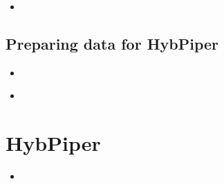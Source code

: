 \documentclass[compress, ucs, xelatex, 11pt, xcolor=x11names, aspectratio=1609,
	hyperref={
		bookmarks=true,
		unicode=true,
		colorlinks=true,
		pdftitle={HybSeq course},
		plainpages=false,
		pdfauthor={Vojtech Zeisek},
		pdfsubject={Practical processing of HybSeq target enrichment sequencing data on computing grids like MetaCentrum},
		pdfcreator={XeLaTeX},
		pdfkeywords={BASH, command line, GNU, HybSeq, Linux, MetaCentrum, sequencing shell, target enrichment},
		linkcolor=Cyan2, %
		anchorcolor=Firebrick2, %
		citecolor=Firebrick2, %
		filecolor=Firebrick2, %
		menucolor=Firebrick2, %
		urlcolor=Chartreuse2, %
		pdftex},
	url={hyphens, lowtilde} %
	]{beamer}
\begin{document}
\begin{frame}[fragile]{}
	\begin{itemize}
		\item 
	\end{itemize}
	\begin{spluscode}
    
	\end{spluscode}
	\begin{bashcode}
    
	\end{bashcode}
\end{frame}

\subsection{Preparing data for HybPiper}

\begin{frame}[fragile]{}
	\begin{itemize}
		\item 
	\end{itemize}
	\begin{spluscode}
    
	\end{spluscode}
	\begin{bashcode}
    
	\end{bashcode}
\end{frame}

\begin{frame}[fragile]{}
	\begin{itemize}
		\item 
	\end{itemize}
	\begin{spluscode}
    
	\end{spluscode}
	\begin{bashcode}
    
	\end{bashcode}
\end{frame}

\section{HybPiper}

\begin{frame}[fragile]{}
	\begin{itemize}
		\item 
	\end{itemize}
	\begin{spluscode}
    
	\end{spluscode}
	\begin{bashcode}
    
	\end{bashcode}
\end{frame}
\end{document}
